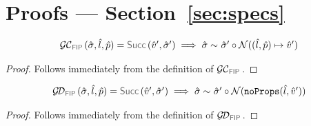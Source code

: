 

\newpage
\section{Proofs --- Section~\ref{sec:specs}}


\newcommand{\unificationfunction}{\textsc{Unification}}
\newcommand{\extendedunificationfunction}{\underline{\textsc{Unification}}}
\newcommand{\emptystate}{\emptyset}
\newcommand{\stateequiv}{\sim}
\newcommand{\stateequivrel}[3]{#1 \sim_{#3} #2}




\begin{lemma}\label{lemma:getcell:fip}
$$
\begin{array}{l}
\GetCellV{\sstate, \sloc, \sexprp} = \success{\sexprv', \sstate'} 
    \implies 
        \stateequivrel{\sstate}{\sstate' \statecompose \normaliser((\sloc, \sexprp) \pointsto \sexprv')}{}
\end{array}
$$
\end{lemma}
\begin{proof}
Follows immediately from the definition of $\GetCellVFun$. 
\end{proof}

\begin{lemma}\label{lemma:getdomain:fip}
$$
\begin{array}{l}
\GetDomainV{\sstate, \sloc, \sexprp} = \success{\sexprv', \sstate'} 
    \implies 
        \stateequivrel{\sstate}{\sstate' \statecompose \normaliser(\emptyfields{\sloc}{\sexprv'})}{}
\end{array}
$$
\end{lemma}
\begin{proof}
Follows immediately from the definition of $\GetDomainVFun$. 
\end{proof}

